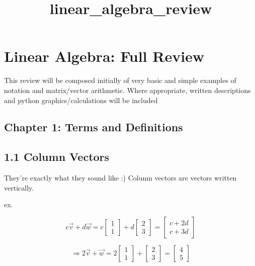 \documentclass{article}
\title{linear\_algebra\_review}
\begin{document}
    
    
    \maketitle
    
    

    
    \section{Linear Algebra: Full Review}\label{linear-algebra-full-review}

This review will be composed initially of very basic and simple examples
of notation and matrix/vector arithmetic. Where appropriate, written
descriptions and python graphics/calculations will be included

    \subsection{Chapter 1: Terms and
Definitions}\label{chapter-1-terms-and-definitions}

\subsection{1.1 Column Vectors}\label{column-vectors}

They're exactly what they sound like :) Column vectors are vectors
written vertically.

ex.

\[ c\vec{v} + d\vec{w} = c\begin{bmatrix} 1 \\ 1 \end{bmatrix} + d\begin{bmatrix} 2 \\ 3 \end{bmatrix} = \begin{bmatrix} c + 2d \\ c + 3d \end{bmatrix}\]

\[ \Rightarrow 2\vec{v} + \vec{w} = 2\begin{bmatrix} 1 \\ 1 \end{bmatrix} + \begin{bmatrix} 2 \\ 3 \end{bmatrix} = \begin{bmatrix} 4 \\ 5 \end{bmatrix}\]
\end{document}

